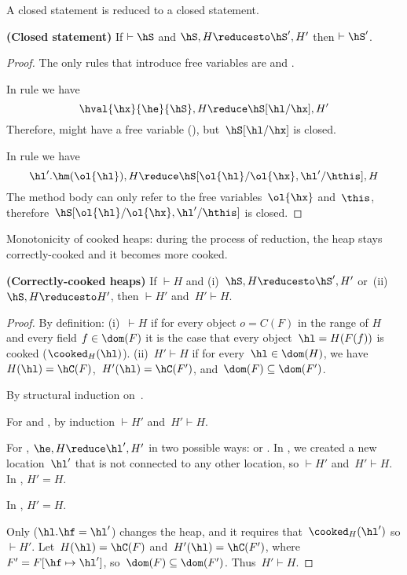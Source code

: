 A closed statement is reduced to a closed statement.
\begin{lemma}
\label{Lemma:closed} \textbf{(Closed statement)}
If $\vdash \hS$ and $\hS,H \reducesto \hS',H'$ then $\vdash \hS'$.
\end{lemma}
\begin{proof}
The only rules that introduce free variables are 
    and .

In rule  we have \[
    \hval{\hx}{\he}{\hS},H \reduce \hS[\hl/\hx], H'
\]
Therefore, \hS might have a free variable (\hx), but~$\hS[\hl/\hx]$ is closed.

In rule  we have \[
    \hl'.\hm(\ol{\hl}),H \reduce \hS[\ol{\hl}/\ol{\hx},\hl'/\hthis],H
\]
The method body can only refer to the free variables~$\ol{\hx}$ and~$\this$,
    therefore~$\hS[\ol{\hl}/\ol{\hx},\hl'/\hthis]$ is closed.
\end{proof}



Monotonicity of cooked heaps: during the process of reduction, the heap stays correctly-cooked and it becomes more cooked.
\begin{lemma}
\label{Lemma:correctly-cooked} \textbf{(Correctly-cooked heaps)}
If $\vdash H$ and (i)~$\hS,H \reducesto \hS',H'$ or~(ii)~$\hS,H \reducesto H'$, then $\vdash H'$ and~$H' \vdash H$.
\end{lemma}
\begin{proof}
By definition:
    (i)~$\vdash H$ if for every object $o=C(F)$ in the range of $H$ and
    every field $f \in \dom(F)$ it is the case that every object~$\hl=H(F(f))$ is cooked ($\cooked_H(\hl)$).
    (ii)~$H' \vdash H$
    if for every~$\hl \in \dom(H)$, we have~$H(\hl)=\hC(F)$,~$H'(\hl)=\hC(F')$, and~$\dom(F)\subseteq\dom(F')$.

By structural induction on~\hS.

For  and , by induction $\vdash H'$ and~$H' \vdash H$.

For , $\he,H \reduce \hl',H'$ in two possible ways:  or .
In , we created a new location~$\hl'$ that is not connected to any other location, so $\vdash H'$ and~$H' \vdash H$.
In , $H'=H$.

In , $H'=H$.

Only  ($\hl.\hf=\hl'$) changes the heap, and it requires that~$\cooked_H(\hl')$ so $\vdash H'$.
Let~$H(\hl)=\hC(F)$ and~$H'(\hl)=\hC(F')$, where~$F'=F[ \hf \mapsto \hl']$, so~$\dom(F)\subseteq\dom(F')$.
Thus~$H' \vdash H$.
\end{proof}




